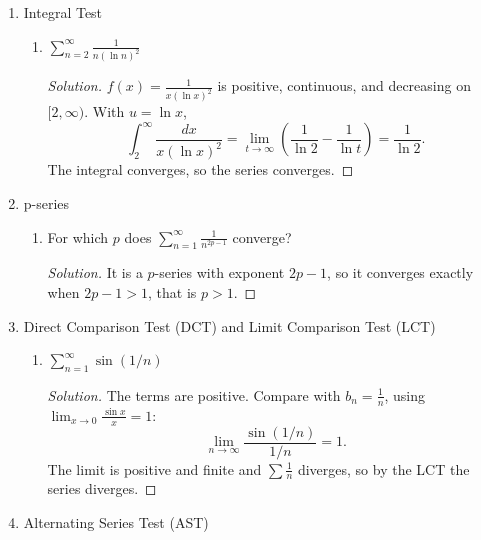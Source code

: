\documentclass[12pt]{article}
\newenvironment{solution}
  {\renewcommand\qedsymbol{$\blacksquare$}\begin{proof}[Solution]}
  {\end{proof}}
\begin{document}
\begin{enumerate}
\begin{enumerate}
\end{enumerate}

\setcounter{enumi}{18}
\item Integral Test
\begin{enumerate}
\item[(a)] $\sum_{n=2}^\infty\frac{1}{n(\ln n)^2}$
\begin{solution}
$f(x)=\frac{1}{x(\ln x)^2}$ is positive, continuous, and decreasing on $[2,\infty)$. With $u=\ln x$,
\[ \int_2^\infty\frac{dx}{x(\ln x)^2}=\lim_{t\to\infty}\left(\frac{1}{\ln2}-\frac{1}{\ln t}\right)=\frac{1}{\ln2}. \]
The integral converges, so the series converges.
\end{solution}




\end{enumerate}

\setcounter{enumi}{19}
\item p-series
\begin{enumerate}



\item[(d)] For which $p$ does $\sum_{n=1}^\infty\frac{1}{n^{2p-1}}$ converge?
\begin{solution}
It is a $p$-series with exponent $2p-1$, so it converges exactly when $2p-1>1$, that is $p>1$.
\end{solution}

\end{enumerate}

\setcounter{enumi}{20}
\item Direct Comparison Test (DCT) and Limit Comparison Test (LCT)
\begin{enumerate}
\item[(a)] $\sum_{n=1}^\infty\sin(1/n)$
\begin{solution}
The terms are positive. Compare with $b_n=\frac1n$, using $\lim_{x\to0}\frac{\sin x}{x}=1$:
\[ \lim_{n\to\infty}\frac{\sin(1/n)}{1/n}=1. \]
The limit is positive and finite and $\sum\frac1n$ diverges, so by the LCT the series diverges.
\end{solution}





\end{enumerate}

\setcounter{enumi}{21}
\item Alternating Series Test (AST)
\begin{enumerate}





\end{enumerate}
\end{enumerate}
\end{document}

